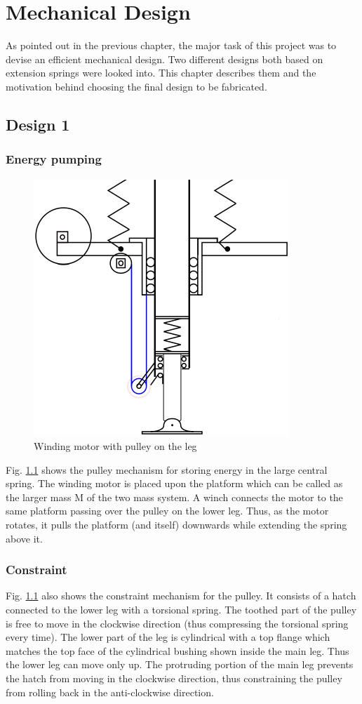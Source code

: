 \chapter{Mechanical Design}
\label{chap:mech_design}
As pointed out in the previous chapter, the major task of this project was to devise an efficient mechanical
design. Two different designs both based on extension springs were looked into. 
This chapter describes them and the motivation behind choosing the final design to be fabricated.

\section{Design 1}
\subsection*{Energy pumping}
\begin{figure}[!h]
\centering
\includegraphics[scale=2]{fig/pratik_des.pdf}
\caption{Winding motor with pulley on the leg}
\label{fig:3_pratik_design}
\end{figure}
Fig. \ref{fig:3_pratik_design} shows the pulley mechanism for storing energy in the large central spring.
The winding motor is placed upon the platform which can be called as the larger mass M of the two mass
system. A winch connects the motor to the same platform passing over the pulley on the lower leg. Thus, as
the motor rotates, it pulls the platform (and itself) downwards while extending the spring above it. 

\subsection*{Constraint}
Fig. \ref{fig:3_pratik_design} also shows the constraint mechanism for the pulley. It consists of a hatch connected to
the lower leg with a torsional spring. The toothed part of the pulley is free to move in the clockwise direction (thus
compressing the torsional spring every time). The lower part of the leg is cylindrical with a top flange which matches
the top face of the cylindrical bushing shown inside the main leg. Thus the lower leg can move only up. The protruding
portion of the main leg prevents the hatch from moving in the clockwise direction, thus constraining the pulley from
rolling back in the anti-clockwise direction.

